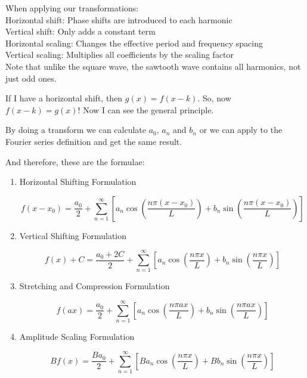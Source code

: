 \documentclass{article}
\begin{document}
\begin{enumerate}
When applying our transformations:\\
Horizontal shift: Phase shifts are introduced to each harmonic\\
Vertical shift: Only adds a constant term\\
Horizontal scaling: Changes the effective period and frequency spacing\\
Vertical scaling: Multiplies all coefficients by the scaling factor\\

Note that unlike the square wave, the sawtooth wave contains all harmonics, not just odd ones.
    \end{enumerate}

If I have a horizontal shift, then $g(x) = f(x-k)$. So, now $f(x-k) = g(x)$! Now I can see the general principle.

By doing a transform we can calculate $a_0$, $a_n$ and $b_n$ or we can apply to the Fourier series definition and get the same result.

And therefore, these are the formulae:
\begin{enumerate}
 \item Horizontal Shifting Formulation
    
    \begin{equation}
    f(x-x_0) = \frac{a_0}{2} + \sum_{n=1}^{\infty} \left[ a_n \cos\left(\frac{n\pi (x-x_0)}{L}\right) + b_n \sin\left(\frac{n\pi (x-x_0)}{L}\right) \right]
    \end{equation}


\item Vertical Shifting Formulation
    
    \begin{equation}
   f(x)+C = \frac{a_0+2C}{2} + \sum_{n=1}^{\infty} \left[ a_n \cos\left(\frac{n\pi x}{L}\right) + b_n \sin\left(\frac{n\pi x}{L}\right) \right]
    \end{equation}

\item Stretching and Compression Formulation

    \begin{equation}
f(ax) = \frac{a_0}{2} + \sum_{n=1}^{\infty} \left[ a_n \cos\left(\frac{n\pi ax}{L}\right) + b_n \sin\left(\frac{n\pi ax}{L}\right) \right]
    \end{equation}

\item Amplitude Scaling Formulation

    \begin{equation}
Bf(x) = \frac{Ba_0}{2} + \sum_{n=1}^{\infty} \left[ Ba_n \cos\left(\frac{n\pi x}{L}\right) + Bb_n \sin\left(\frac{n\pi x}{L}\right) \right]
    \end{equation}

\end{enumerate}
\end{document}
